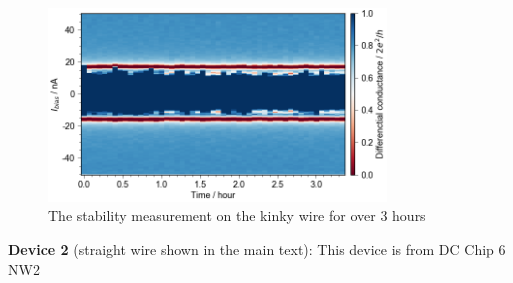 \begin{figure}[h!]
    \centering
    \includegraphics[width=0.8\textwidth]{Pic/KinkySta.png}
    \caption{The stability measurement on the kinky wire for over 3 hours}
    \label{kinkysta}
\end{figure}

\clearpage

\noindent \textbf{Device 2} (straight wire shown in the main text): This device is from DC Chip 6 NW2


